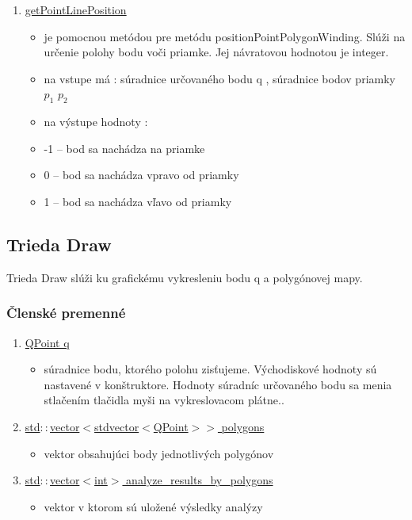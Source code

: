 \documentclass[12pt]{article}
\begin{document}
\begin{enumerate}
\item[] \underline{getPointLinePosition}
\begin{itemize}
\item je pomocnou metódou pre metódu positionPointPolygonWinding. Slúži na určenie polohy bodu voči priamke. Jej návratovou hodnotou je integer.
\item na vstupe má : súradnice určovaného bodu q , súradnice bodov priamky $p_1$ $p_2$
\item na výstupe hodnoty :
\item[] -1 – bod sa nachádza na priamke
\item[] 0 – bod sa nachádza vpravo od priamky
\item[] 1 – bod sa nachádza vľavo od priamky
\end{itemize}
\end{enumerate}

\subsection{Trieda Draw}
Trieda Draw slúži ku grafickému vykresleniu bodu q a polygónovej mapy.

\subsubsection{Členské premenné}

\begin{enumerate}
\item[] \underline{QPoint q}
\begin{itemize}
\item súradnice bodu, ktorého polohu zisťujeme. Východiskové hodnoty sú nastavené v konštruktore. Hodnoty súradníc určovaného bodu sa menia stlačením tlačidla myši na vykreslovacom plátne..
\end{itemize}
\item[] \underline{std$::$vector$<$stdvector$<$QPoint$>>$ polygons}
\begin{itemize}
\item vektor obsahujúci body jednotlivých polygónov
\end{itemize}
\item[] \underline{std$::$vector$<$int$>$ analyze\_results\_by\_polygons}
\begin{itemize}
\item vektor v ktorom sú uložené výsledky analýzy
\end{itemize}
\end{enumerate}
\end{document}
